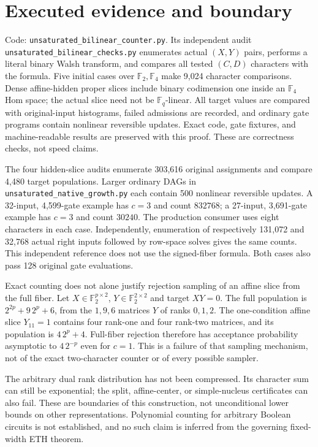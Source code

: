 \documentclass[11pt]{article}
\newcommand{\F}{\mathbb F}\newcommand{\Hom}{\operatorname{Hom}}
\begin{document}
\section{Executed evidence and boundary}
Code: \texttt{unsaturated\_bilinear\_counter.py}. Its independent audit
\texttt{unsaturated\_bilinear\_checks.py} enumerates actual $(X,Y)$ pairs,
performs a literal binary Walsh transform, and compares all tested $(C,D)$
characters with the formula. Five initial cases over $\F_2,\F_4$ make 9,024
character comparisons. Dense affine-hidden proper slices include binary
codimension one inside an $\F_4$ Hom space; the actual slice need not be
$\F_q$-linear. All target values are compared with original-input histograms,
failed admissions are recorded, and ordinary gate programs contain nonlinear
reversible updates. Exact code, gate fixtures, and machine-readable results
are preserved with this proof. These are correctness checks, not speed claims.

The four hidden-slice audits enumerate 303,616 original assignments and compare
4,480 target populations. Larger ordinary DAGs in
\texttt{unsaturated\_native\_growth.py} each contain 500 nonlinear reversible
updates. A 32-input, 4,599-gate example has $c=3$ and count $832768$; a
27-input, 3,691-gate example has $c=3$ and count $30240$. The production
consumer uses eight characters in each case. Independently, enumeration of
respectively 131,072 and 32,768 actual right inputs followed by row-space
solves gives the same counts. This independent reference does not use the
signed-fiber formula. Both cases also pass 128 original gate evaluations.

Exact counting does not alone justify rejection sampling of an affine slice
from the full fiber. Let $X\in\F_2^{p\times2}$, $Y\in\F_2^{2\times2}$ and
target $XY=0$. The full population is $2^{2p}+9\,2^p+6$, from the $1,9,6$
matrices $Y$ of ranks $0,1,2$. The one-condition affine slice $Y_{11}=1$
contains four rank-one and four rank-two matrices, and its population is
$4\,2^p+4$. Full-fiber rejection therefore has acceptance probability
asymptotic to $4\,2^{-p}$ even for $c=1$. This is a failure of that sampling
mechanism, not of the exact two-character counter or of every possible sampler.

The arbitrary dual rank distribution has not been compressed. Its character
sum can still be exponential; the split, affine-center, or simple-nucleus
certificates can also fail. These are boundaries of this construction, not
unconditional lower bounds on other representations. Polynomial counting for
arbitrary Boolean circuits is not established, and no such claim is inferred
from the governing fixed-width ETH theorem.
\end{document}
